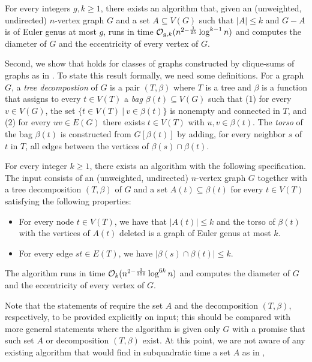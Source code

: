 \begin{theorem}\label{thm:main-apices}
For every integers $g,k \geq 1$, 
there exists an algorithm that, given an (unweighted, undirected) $n$-vertex graph $G$
and a set $A \subseteq V(G)$ such that $|A| \leq k$ and $G-A$ is
of Euler genus at most $g$, runs in time $\mathcal{O}_{g,k}(n^{2-\frac{1}{25}} \log^{k-1} n)$
and computes the diameter of $G$ and the eccentricity of every vertex of $G$.
\end{theorem}
Second, we show that  holds for classes of graphs
constructed by clique-sums of graphs as in .
To state this result formally, we need some definitions. For a graph $G$,
   a \emph{tree decompostion} of $G$ is a pair $(T,\beta)$ where $T$ is a tree
  and $\beta$ is a function that assigns to every $t \in V(T)$ a \emph{bag} 
  $\beta(t) \subseteq V(G)$ such that (1) for every $v \in V(G)$, the set $\{t \in V(T)~|~v \in \beta(t)\}$ is nonempty and connected in $T$, and (2) for every $uv \in E(G)$ there exists $t \in V(T)$ with $u,v \in \beta(t)$. 
 The \emph{torso} of the bag $\beta(t)$ is constructed from $G[\beta(t)]$ by adding, for every
 neighbor $s$ of $t$ in $T$, all edges between the vertices of $\beta(s) \cap \beta(t)$.
\begin{theorem}\label{thm:main-decomp}
For every integer $k \geq 1$, 
there exists an algorithm with the following specification.
The input consists of an (unweighted, undirected) $n$-vertex graph $G$
together with a tree decomposition $(T,\beta)$ of $G$ and a set $A(t) \subseteq \beta(t)$ for
every $t \in V(T)$ satisfying the following properties:
\begin{itemize}[nosep]
\item For every node $t \in V(T)$, we have that $|A(t)| \leq k$ and the torso of $\beta(t)$ with the vertices
of $A(t)$ deleted is a graph of Euler genus at most $k$.
\item For every edge $st \in E(T)$, we have $|\beta(s) \cap \beta(t)| \leq k$.
\end{itemize}
The algorithm runs in time $\mathcal{O}_k(n^{2-\frac{1}{356}} \log^{6k} n)$ and computes
the diameter of $G$ and the eccentricity of every vertex of $G$.
\end{theorem}
Note that the statements of
 require the set $A$ and
the decomposition $(T,\beta)$, respectively, to be provided explicitly on input;
this should be compared with more general statements where the algorithm is 
given only $G$ with a promise that such set $A$ or decomposition $(T,\beta)$ exist. At this point, we are not aware of any existing algorithm that would find in subquadratic time a set $A$ as in ,
